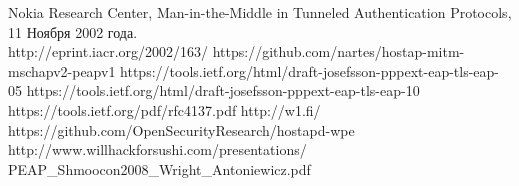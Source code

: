 \documentclass[oneside, final, 14pt]{extarticle}
\begin{document}
\begin{thebibliography}{99}
    Nokia Research Center,
    Man-in-the-Middle in Tunneled Authentication Protocols,
    11 Ноября 2002 года. \\
    http://eprint.iacr.org/2002/163/
    https://github.com/nartes/hostap-mitm-mschapv2-peapv1
    https://tools.ietf.org/html/draft-josefsson-pppext-eap-tls-eap-05
    https://tools.ietf.org/html/draft-josefsson-pppext-eap-tls-eap-10
    https://tools.ietf.org/pdf/rfc4137.pdf
    http://w1.fi/
    https://github.com/OpenSecurityResearch/hostapd-wpe
    http://www.willhackforsushi.com/presentations/\\
    PEAP\_Shmoocon2008\_Wright\_Antoniewicz.pdf
\end{thebibliography}
\end{document}
